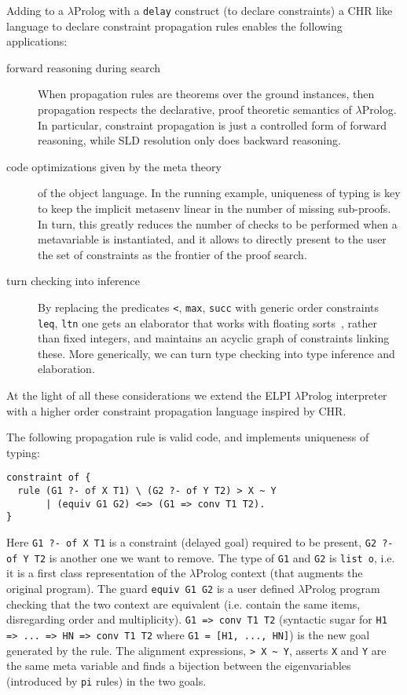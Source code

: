 \documentclass{easychair}
\begin{document}
Adding to a $\lambda$Prolog with a \verb+delay+ construct (to declare constraints) a CHR like language to declare constraint propagation rules
enables the following applications:
\begin{description}
\item[forward reasoning during search] When propagation rules are theorems
        over the ground instances,
	then propagation respects the declarative, proof theoretic semantics
        of $\lambda$Prolog. In particular, constraint propagation is just a
        controlled form of forward reasoning, while SLD resolution only
	does backward reasoning.
\item[code optimizations given by the meta theory] of the object
	language.  In the running example, uniqueness of typing is key to keep
	the implicit metasenv linear in the number of missing sub-proofs.
        In turn, this greatly reduces the number of checks to be performed when
        a metavariable is instantiated, and it allows to directly present to
        the user the set of constraints as the frontier of the proof search.
\item[turn checking into inference]  By replacing the
	predicates \verb+<+, \verb+max+, \verb+succ+ with generic 
	order constraints
	\verb+leq+, \verb+ltn+ one gets an elaborator that works with 
	floating sorts~\cite{algebraic},
	rather than fixed integers, and maintains an acyclic graph of
	constraints linking these. More generically, we can turn type checking into type inference and elaboration.
\end{description}

At the light of all these considerations we extend the ELPI
$\lambda$Prolog interpreter with a higher order constraint propagation
language inspired by CHR.

The following propagation rule is valid code, and implements
uniqueness of typing:

\begin{Verbatim}
constraint of {
  rule (G1 ?- of X T1) \ (G2 ?- of Y T2) > X ~ Y
       | (equiv G1 G2) <=> (G1 => conv T1 T2).
}
\end{Verbatim}

Here \verb+G1 ?- of X T1+ is a constraint (delayed goal) required
to be present, \verb+G2 ?- of Y T2+ is another one we want to remove.
The type of \verb+G1+ and \verb+G2+ is \verb+list o+, i.e.
it is a first class representation of the $\lambda$Prolog context
(that augments the original program).  
The guard \verb+equiv G1 G2+ is a user defined $\lambda$Prolog program
checking that the two context are equivalent (i.e.
contain the same items, disregarding order and multiplicity).  \verb+G1 => conv T1 T2+ (syntactic sugar for \verb+H1 => ... => HN => conv T1 T2+ where
\verb+G1 = [H1, ..., HN]+) is the new goal generated by the rule.
The alignment expressions, \verb+> X ~ Y+, asserts \verb+X+ and \verb+Y+
are the same meta variable and finds a bijection between the
eigenvariables (introduced by \verb+pi+ rules) in the two goals.
\end{document}
